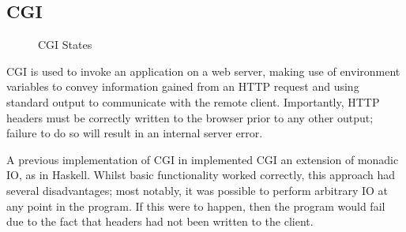 \documentclass[preprint]{sigplanconf}
\begin{document}
\subsection{CGI}
\begin{figure}[htpb!]
\centering
{}
\caption{CGI States}
\label{fig:cgistates}
\end{figure}

CGI is used to invoke an application on a web server, making use of environment variables to convey information gained from an HTTP request and using standard output to communicate with the remote client. Importantly, HTTP headers must be correctly written to the browser prior to any other output; failure to do so will result in an internal server error.

A previous implementation of CGI in \idris{} implemented CGI an extension of monadic IO, as in Haskell. Whilst basic functionality worked correctly, this approach had several disadvantages; most notably, it was possible to perform arbitrary IO at any point in the program. If this were to happen, then the program would fail due to the fact that headers had not been written to the client.
\end{document}
